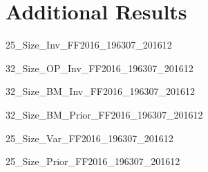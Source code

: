 
\section{Additional Results} \label{sec:addl_results}

{25_Size_Inv_FF2016_196307_201612}

\begin{landscape}
{32_Size_OP_Inv_FF2016_196307_201612}
\end{landscape}

\begin{landscape}
{32_Size_BM_Inv_FF2016_196307_201612}
\end{landscape}

\begin{landscape}
{32_Size_BM_Prior_FF2016_196307_201612}
\end{landscape}

{25_Size_Var_FF2016_196307_201612}

{25_Size_Prior_FF2016_196307_201612}
